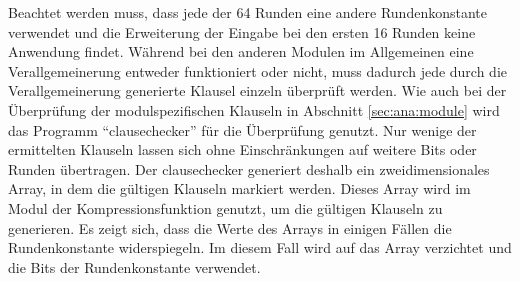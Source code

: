 Beachtet werden muss, dass jede der 64 Runden eine andere Rundenkonstante verwendet und die Erweiterung der Eingabe bei den ersten 16 Runden keine
Anwendung findet. Während bei den anderen Modulen im Allgemeinen eine Verallgemeinerung entweder funktioniert oder nicht, muss dadurch jede durch die
Verallgemeinerung generierte Klausel einzeln überprüft werden. Wie auch bei der Überprüfung der modulspezifischen Klauseln in Abschnitt \ref{sec:ana:module}
wird das Programm "`clausechecker"' für die Überprüfung genutzt. Nur wenige der ermittelten Klauseln lassen sich ohne Einschränkungen auf weitere Bits oder
Runden übertragen. Der clausechecker generiert deshalb ein zweidimensionales Array, in dem die gültigen Klauseln markiert werden. Dieses Array wird im
Modul der Kompressionsfunktion genutzt, um die gültigen Klauseln zu generieren. Es zeigt sich, dass die Werte des Arrays in einigen Fällen die Rundenkonstante
widerspiegeln. Im diesem Fall wird auf das Array verzichtet und die Bits der Rundenkonstante verwendet.